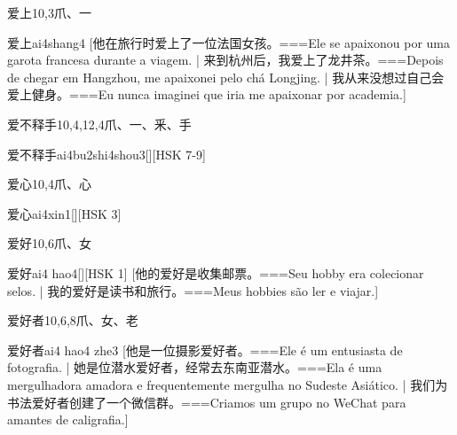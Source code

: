 \begin{Entry}{爱上}{10,3}{⽖、⼀}
  \begin{Phonetics}{爱上}{ai4shang4}
    [他在旅行时爱上了一位法国女孩。===Ele se apaixonou por uma garota francesa durante a viagem.  | 来到杭州后，我爱上了龙井茶。===Depois de chegar em Hangzhou, me apaixonei pelo chá Longjing. | 我从来没想过自己会爱上健身。===Eu nunca imaginei que iria me apaixonar por academia.]
  \end{Phonetics}
\end{Entry}

\begin{Entry}{爱不释手}{10,4,12,4}{⽖、⼀、⾤、⼿}
  \begin{Phonetics}{爱不释手}{ai4bu2shi4shou3}[][HSK 7-9]
  \end{Phonetics}
\end{Entry}

\begin{Entry}{爱心}{10,4}{⽖、⼼}
  \begin{Phonetics}{爱心}{ai4xin1}[][HSK 3]
  \end{Phonetics}
\end{Entry}

\begin{Entry}{爱好}{10,6}{⽖、⼥}
  \begin{Phonetics}{爱好}{ai4 hao4}[][HSK 1]
    [他的爱好是收集邮票。===Seu hobby era colecionar selos.  | 我的爱好是读书和旅行。===Meus hobbies são ler e viajar.]
  \end{Phonetics}
\end{Entry}

\begin{Entry}{爱好者}{10,6,8}{⽖、⼥、⽼}
  \begin{Phonetics}{爱好者}{ai4 hao4 zhe3}
    [他是一位摄影爱好者。===Ele é um entusiasta de fotografia. | 她是位潜水爱好者，经常去东南亚潜水。===Ela é uma mergulhadora amadora e frequentemente mergulha no Sudeste Asiático.  | 我们为书法爱好者创建了一个微信群。===Criamos um grupo no WeChat para amantes de caligrafia.]
  \end{Phonetics}
\end{Entry}

